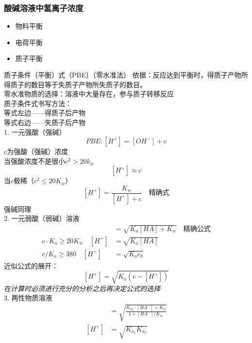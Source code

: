 \documentclass[utf8,a4paper,12pt]{ctexart}
\begin{document}
\subsubsection{酸碱溶液中氢离子浓度}
\begin{itemize}
\item 物料平衡
\item 电荷平衡
\item 质子平衡
\end{itemize}
质子条件（平衡）式（PBE）（零水准法）
依据：反应达到平衡时，得质子产物所得质子的数目等于失质子产物所失质子的数目。\\
零水准物质的选择：溶液中大量存在，参与质子转移反应\\
质子条件式书写方法：\\
等式左边——得质子后产物\\
等式右边——失质子后产物\\
1. 一元强酸（强碱）\\
\[PBE: [H^+] = [OH^-] + c\]
c为强酸（强碱）浓度\\
当强酸浓度不是很小$c^2>20k_w$\\
\[[H^+] \approx c\]
当$c$极稀（$c^2\leq 20K_w$）\\
\[[H^+] = \frac{K_w}{[H^+]+c}\quad \text{精确式}\]
强碱同理\\
2. 一元弱酸（弱碱）溶液\\
\begin{align*}
[H^+] &= \sqrt{K_a[HA]+K_w}\quad \text{精确公式}\\
c\cdot K_a \geq 20K_w\quad [H^+] &= \sqrt{K_a[HA]}\\
c/K_a \geq 380 \quad[H^+] &= \sqrt{K_ac_0}
\end{align*}
近似公式的展开：
\[[H^+] = \sqrt{K_a(c-[H^+])}\]
\emph{在计算时必须进行充分的分析之后再决定公式的选择}\\
3. 两性物质溶液\\
\begin{align*}
[H^+] &= \sqrt{\frac{K_{a_2}\cdot[HA^-]+K_w}{1+[HA^-]/K_{a_1}}}\\
[H^+] &= \sqrt{K_{a_1}K_{a_2}}
\end{align*} 
\end{document}
